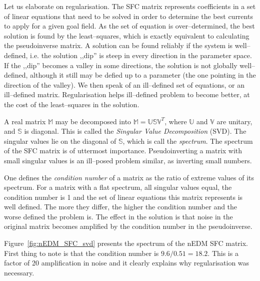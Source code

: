 Let us elaborate on regularisation. The SFC matrix represents coefficients in a set of linear equations that need to be solved in order to determine the best currents to apply for a given goal field. As the set of equation is over--determined, the best solution is found by the least--squares, which is exactly equivalent to calculating the pseudoinverse matrix. A solution can be found reliably if the system is well--defined, i.e. the solution ,,dip'' is steep in every direction in the parameter space. If the ,,dip'' becomes a valley in some directions, the solution is not globally well--defined, although it still may be defied up to a parameter (the one pointing in the direction of the valley). We then speak of an ill--defined set of equations, or an ill--defined matrix. Regularisation helps ill--defined problem to become better, at the cost of the least--squares in the solution.


A real matrix $\mathbb{M}$ may be decomposed into $\mathbb{M} = \mathbb{U} \mathbb{S} \mathbb{V}^T$, where $\mathbb{U}$ and $\mathbb{V}$ are unitary, and $\mathbb{S}$ is diagonal. This is called the \emph{Singular Value Decomposition} (SVD). The singular values lie on the diagonal of $\mathbb{S}$, which is call the \emph{spectrum}. The spectrum of the SFC matrix is of uttermost importance. Pseudoinverting a matrix with small singular values is an ill--posed problem similar, as inverting small numbers.

One defines the \emph{condition number} of a matrix as the ratio of extreme values of its spectrum. For a matrix with a flat spectrum, all singular values equal, the condition number is 1 and the set of linear equations this matrix represents is well defined. The more they differ, the higher the condition number and the worse defined the problem is. The effect in the solution is that noise in the original matrix becomes amplified by the condition number in the pseudoinverse.

Figure~\ref{fig:nEDM_SFC_svd} presents the spectrum of the nEDM SFC matrix. First thing to note is that the condition number is $9.6 / 0.51 = 18.2$. This is a factor of 20 amplification in noise and it clearly explains why regularisation was necessary.

